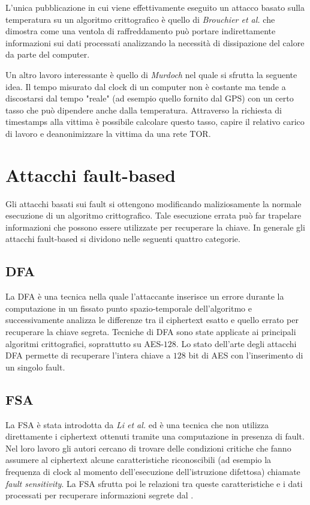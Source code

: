 		L'unica pubblicazione in cui viene effettivamente eseguito un attacco basato sulla temperatura su un algoritmo crittografico è quello di \emph{Brouchier et al.}\cite{brouchier2009temperature} che dimostra come una ventola di raffreddamento può portare indirettamente informazioni sui dati processati analizzando la necessità di dissipazione del calore da parte del computer.
		
		Un altro lavoro interessante è quello di \emph{Murdoch}\cite{murdoch2006hot} nel quale si sfrutta la seguente idea. Il tempo misurato dal clock di un computer non è costante ma tende a discostarsi dal tempo "reale" (ad esempio quello fornito dal \acs{GPS}) con un certo tasso che può dipendere anche dalla temperatura\cite{vig1992introduction}. Attraverso la richiesta di timestamps alla vittima è possibile calcolare questo tasso, capire il relativo carico di lavoro e deanonimizzare la vittima da una rete \acs{TOR}.
		
	\section{Attacchi fault-based}
		Gli attacchi basati sui fault si ottengono modificando maliziosamente la normale esecuzione di un algoritmo crittografico. Tale esecuzione errata può far trapelare informazioni che possono essere utilizzate per recuperare la chiave. In generale gli attacchi fault-based si dividono nelle seguenti quattro categorie\cite{patranabis2018fault}.
		
		\subsection*{\ac{DFA}}
			La \ac{DFA} è una tecnica nella quale l'attaccante inserisce un errore durante la computazione in un fissato punto spazio-temporale dell'algoritmo e successivamente analizza le differenze tra il ciphertext esatto e quello errato per recuperare la chiave segreta. Tecniche di \ac{DFA} sono state applicate ai principali algoritmi crittografici, soprattutto su \ac{AES}-$128$. Lo stato dell'arte degli attacchi \ac{DFA} permette di recuperare l'intera chiave a $128$ bit di \ac{AES} con l'inserimento di un singolo fault\cite{tunstall2011differential}.
			
		\subsection*{\ac{FSA}}
			La \ac{FSA} è stata introdotta da \emph{Li et al.}\cite{li2010fault} ed è una tecnica che non utilizza direttamente i ciphertext ottenuti tramite una computazione in presenza di fault. Nel loro lavoro gli autori cercano di trovare delle condizioni critiche che fanno assumere al ciphertext alcune caratteristiche riconoscibili (ad esempio la frequenza di clock al momento dell'esecuzione dell'istruzione difettosa) chiamate \emph{fault sensitivity}. La \ac{FSA} sfrutta poi le relazioni tra queste caratteristiche e i dati processati per recuperare informazioni segrete dal \disps.
			
